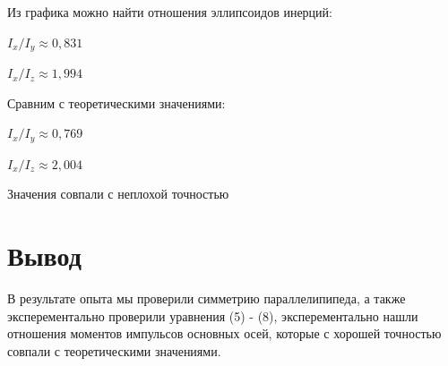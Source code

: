 Из графика можно найти отношения эллипсоидов инерций:

$I_x / I_y \approx 0,831$

$I_x / I_z \approx 1,994$

Сравним с теоретическими значениями:

$I_x / I_y \approx 0,769$

$I_x / I_z \approx 2,004$

Значения совпали с неплохой точностью

\section{Вывод}

В результате опыта мы проверили симметрию параллелипипеда, а также эксперементально проверили уравнения (5) - (8), эксперементально нашли отношения моментов импульсов основных осей, которые с хорошей точностью совпали с теоретическими значениями.
